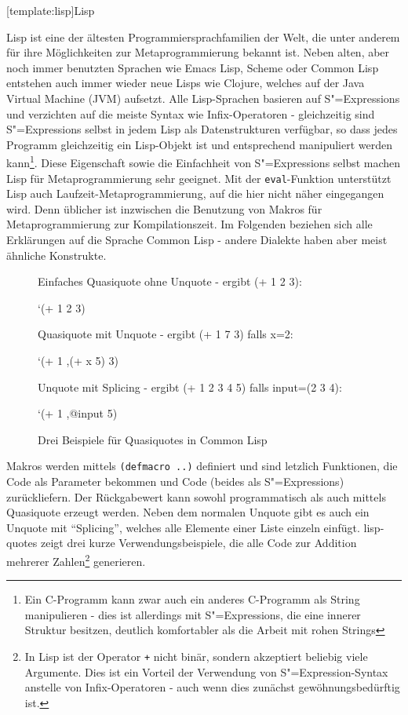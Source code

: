 \documentclass[11pt, a4paper, bibgerm]{scrbook}
\newcommand\icode[1]{\lstinline?#1?}
\newcommand\lsection{}
\newcommand\abb{}
\newcommand{\sexp}{S"=Expression}
\newcommand{\sexps}{S"=Expressions}
\begin{document}
\lsection[template:lisp]{Lisp}

Lisp ist eine der ältesten Programmiersprachfamilien der Welt, die unter
anderem für ihre Möglichkeiten zur Metaprogrammierung bekannt ist. Neben
alten, aber noch immer benutzten Sprachen wie Emacs Lisp, Scheme oder
Common Lisp entstehen auch immer wieder neue Lisps wie
Clojure\cite{Clojure}, welches auf der Java Virtual Machine (JVM)
aufsetzt. Alle Lisp-Sprachen basieren auf \sexps{} und verzichten auf
die meiste Syntax wie Infix-Operatoren - gleichzeitig sind \sexps{}
selbst in jedem Lisp als Datenstrukturen verfügbar, so dass jedes
Programm gleichzeitig ein Lisp-Objekt ist und entsprechend manipuliert
werden kann\footnote{Ein C-Programm kann zwar auch ein anderes
  C-Programm als String manipulieren - dies ist allerdings mit \sexps{},
  die eine innerer Struktur besitzen, deutlich komfortabler als die
  Arbeit mit rohen Strings}. Diese Eigenschaft sowie die Einfachheit von
\sexps{} selbst machen Lisp für Metaprogrammierung sehr geeignet. Mit
der \icode{eval}-Funktion unterstützt Lisp auch
Laufzeit-Metaprogrammierung, auf die hier nicht näher eingegangen
wird. Denn üblicher ist inzwischen die Benutzung von Makros für
Metaprogrammierung zur Kompilationszeit. Im Folgenden beziehen sich alle
Erklärungen auf die Sprache Common Lisp - andere Dialekte haben aber
meist ähnliche Konstrukte.

\begin{figure}[h]
  \centering
  \begin{code}
Einfaches Quasiquote ohne Unquote - ergibt (+ 1 2 3):

 `(+ 1 2 3)


Quasiquote mit Unquote - ergibt (+ 1 7 3) falls x=2:

`(+ 1 ,(+ x 5) 3)


Unquote mit Splicing - ergibt (+ 1 2 3 4 5) falls input=(2 3 4):

`(+ 1 ,@input 5)
  \end{code}
  \caption{Drei Beispiele für Quasiquotes in Common Lisp}
  \label{magicl:fig:lisp-quotes}
\end{figure}

Makros werden mittels \icode{(defmacro ..)} definiert und sind letzlich
Funktionen, die Code als Parameter bekommen und Code (beides als
\sexps{}) zurückliefern. Der Rückgabewert kann sowohl programmatisch als
auch mittels Quasiquote erzeugt werden. Neben dem normalen Unquote gibt
es auch ein Unquote mit "`Splicing"', welches alle Elemente einer Liste
einzeln einfügt. \abb{lisp-quotes} zeigt drei kurze
Verwendungsbeispiele, die alle Code zur Addition mehrerer
Zahlen\footnote{In Lisp ist der Operator \icode{+} nicht binär, sondern
  akzeptiert beliebig viele Argumente. Dies ist ein Vorteil der
  Verwendung von \sexp{}-Syntax anstelle von Infix-Operatoren - auch
  wenn dies zunächst gewöhnungsbedürftig ist.} generieren.
\end{document}
